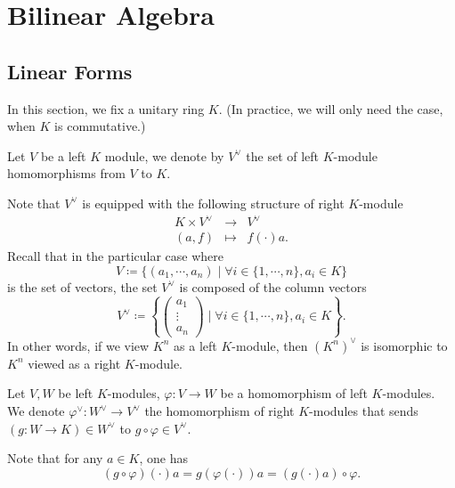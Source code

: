 \chapter{Bilinear Algebra}
\section{Linear Forms}\label{2.1}
\quad In this section, we fix a unitary ring $K$. (In practice, we will only need the case, when $K$ is commutative.)

\begin{definitionenv}\label{2.1.1}
    Let $V$ be a left $K$ module, we denote by $V^\vee $ the set of left $K$-module homomorphisms from $V$ to $K$.

    \quad Note that $V^\vee$ is equipped with the following structure of right $K$-module
    $$ \begin{array}{rcl}
        K \times V^\vee & \longrightarrow & V^\vee\\
        (a,f) & \longmapsto & f(\cdot) a.
    \end{array}$$
    Recall that in the particular case where 
    $$
    V\coloneq \{(a_1, \cdots, a_n)\mid \forall i\in \{1,\cdots,n\},a_i\in K\}
    $$
    is the set of vectors, the set $V^\vee$ is composed of the column vectors
    $$
    V^\vee \coloneq \left\{ 
        \begin{pmatrix}
        a_1\\
        \vdots\\
        a_n
        \end{pmatrix}\mid \forall i\in \{1,\cdots , n\}, a_i\in K \right\}.
    $$
    In other words, if we view $K^n$ as a left $K$-module, then $(K^n)^{\vee}$ is isomorphic to $K^n$ viewed as a right $K$-module.
\end{definitionenv}
\begin{definitionenv}
    Let $V,W$ be left $K$-modules, $\varphi: V\rightarrow W$ be a homomorphism of left $K$-modules. We denote $\varphi^\vee : W^\vee \rightarrow V^\vee$ the homomorphism of right $K$-modules that sends $(g:W\rightarrow K) \in W^\vee$ to $g\circ \varphi \in V^\vee$.
    \begin{center}
    \end{center}
    Note that for any $a\in K$, one has
    $$
    \left(g\circ \varphi\right)\left(\cdot\right) a = g\left(\varphi\left(\cdot\right)\right) a = \left(g\left(\cdot\right)a \right) \circ \varphi.
    $$
\end{definitionenv}

